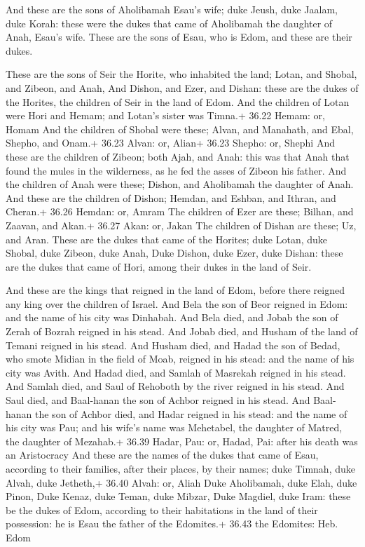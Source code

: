  And these are the sons of Aholibamah Esau's wife; duke
Jeush, duke Jaalam, duke Korah: these were the dukes that came of
Aholibamah the daughter of Anah, Esau's wife.  These are
the sons of Esau, who is Edom, and these are their dukes.

 These are the sons of Seir the Horite, who inhabited the
land; Lotan, and Shobal, and Zibeon, and Anah,  And Dishon,
and Ezer, and Dishan: these are the dukes of the Horites, the children
of Seir in the land of Edom.  And the children of Lotan
were Hori and Hemam; and Lotan's sister was Timna.+ 36.22 Hemam: or,
Homam  And the children of Shobal were these; Alvan, and
Manahath, and Ebal, Shepho, and Onam.+ 36.23 Alvan: or, Alian+ 36.23
Shepho: or, Shephi  And these are the children of Zibeon;
both Ajah, and Anah: this was that Anah that found the mules in the
wilderness, as he fed the asses of Zibeon his father.  And
the children of Anah were these; Dishon, and Aholibamah the daughter of
Anah.  And these are the children of Dishon; Hemdan, and
Eshban, and Ithran, and Cheran.+ 36.26 Hemdan: or, Amram 
The children of Ezer are these; Bilhan, and Zaavan, and Akan.+ 36.27
Akan: or, Jakan  The children of Dishan are these; Uz, and
Aran.  These are the dukes that came of the Horites; duke
Lotan, duke Shobal, duke Zibeon, duke Anah,  Duke Dishon,
duke Ezer, duke Dishan: these are the dukes that came of Hori, among
their dukes in the land of Seir.

 And these are the kings that reigned in the land of
Edom, before there reigned any king over the children of Israel.
 And Bela the son of Beor reigned in Edom: and the name of
his city was Dinhabah.  And Bela died, and Jobab the son of
Zerah of Bozrah reigned in his stead.  And Jobab died, and
Husham of the land of Temani reigned in his stead.  And
Husham died, and Hadad the son of Bedad, who smote Midian in the field
of Moab, reigned in his stead: and the name of his city was Avith.
 And Hadad died, and Samlah of Masrekah reigned in his
stead.  And Samlah died, and Saul of Rehoboth by the river
reigned in his stead.  And Saul died, and Baal-hanan the
son of Achbor reigned in his stead.  And Baal-hanan the son
of Achbor died, and Hadar reigned in his stead: and the name of his city
was Pau; and his wife's name was Mehetabel, the daughter of Matred, the
daughter of Mezahab.+ 36.39 Hadar, Pau: or, Hadad, Pai: after his death
was an Aristocracy  And these are the names of the dukes
that came of Esau, according to their families, after their places, by
their names; duke Timnah, duke Alvah, duke Jetheth,+ 36.40 Alvah: or,
Aliah  Duke Aholibamah, duke Elah, duke Pinon,
 Duke Kenaz, duke Teman, duke Mibzar,  Duke
Magdiel, duke Iram: these be the dukes of Edom, according to their
habitations in the land of their possession: he is Esau the father of
the Edomites.+ 36.43 the Edomites: Heb. Edom

